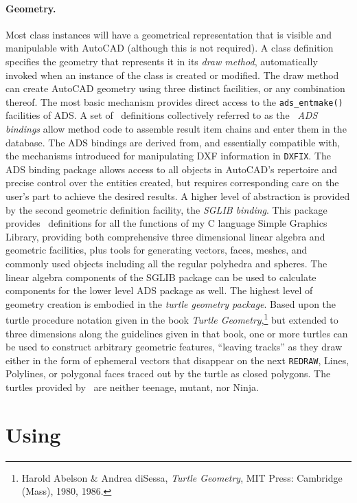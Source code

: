 \documentclass{article}
\begin{document}
\paragraph{Geometry.}
Most class instances will have a geometrical representation that is
visible and manipulable with AutoCAD (although this is not required).
A class definition specifies the geometry that represents it in its {\em
draw method}, automatically invoked when an instance of the
class is created or modified.  The draw method can create AutoCAD
geometry using three distinct facilities, or any combination thereof.
The most basic mechanism provides direct access to the
\verb+ads_entmake()+ facilities of ADS\@.  A set of \atlas\
definitions collectively referred to as the {\em \atlas\ ADS bindings}
allow method code to assemble result item chains and enter them in the
database.  The ADS bindings are derived from, and essentially
compatible with, the mechanisms introduced for manipulating DXF
information in {\tt DXFIX}\@.  The ADS binding package allows access
to all objects in AutoCAD's repertoire and precise control over the
entities created, but requires corresponding care on the user's part
to achieve the desired results.  A higher level of abstraction is
provided by the second geometric definition facility, the {\em SGLIB
binding}.  This package provides \atlas\ definitions for all the
functions of my C language Simple Graphics Library, providing both
comprehensive three dimensional linear algebra and geometric
facilities, plus tools for generating vectors, faces, meshes, and
commonly used objects including all the regular polyhedra and spheres.
The linear algebra components of the SGLIB package can be used to
calculate components for the lower level ADS package as well.
The highest level of geometry creation is embodied in the {\em turtle
geometry package}.  Based upon the turtle procedure notation given
in the book {\sl Turtle Geometry},\footnote{Harold Abelson \& Andrea
diSessa, {\em Turtle Geometry}, MIT Press: Cambridge (Mass), 1980,
1986.} but extended to three dimensions along the guidelines given in that
book, one or more turtles can be used to construct arbitrary geometric
features, ``leaving tracks'' as they draw either in the form of
ephemeral vectors that disappear on the next {\tt REDRAW}, Lines,
Polylines, or polygonal faces traced out by the turtle as closed
polygons.  The turtles provided by \cw\ are neither teenage, mutant,
nor Ninja.

\section{Using \cw}
\end{document}
